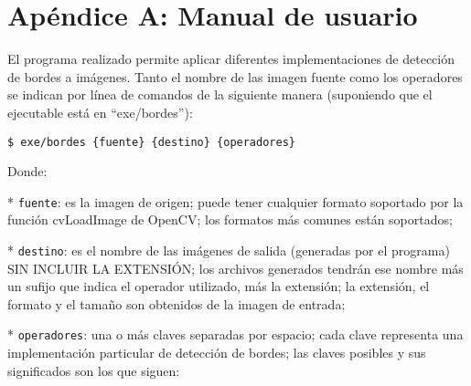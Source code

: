\section{Apéndice A: Manual de usuario}

El programa realizado permite aplicar diferentes implementaciones de detección de bordes a imágenes. Tanto el nombre de las imagen fuente como los operadores se indican por línea de comandos de la siguiente manera (suponiendo que el ejecutable está en ``exe/bordes''):


   {\small \verb=$ exe/bordes {fuente} {destino} {operadores} =}

    
Donde:

    * \texttt{fuente}: es la imagen de origen; puede tener cualquier formato soportado por la función cvLoadImage de OpenCV; los formatos más comunes están soportados;
    
    * \texttt{destino}: es el nombre de las imágenes de salida (generadas por el programa) SIN INCLUIR LA EXTENSIÓN; los archivos generados tendrán ese nombre más un sufijo que indica el operador utilizado, más la extensión; la extensión, el formato y el tamaño son obtenidos de la imagen de entrada;
    
    * \texttt{operadores}: una o más claves separadas por espacio; cada clave representa una implementación particular de detección de bordes; las claves posibles y sus significados son los que siguen:

